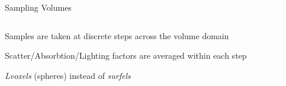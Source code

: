 \documentclass[10pt,compress,professionalfont]{beamer}
\begin{document}
\begin{frame}{Sampling Volumes}

    \begin{columns}
        \begin{column}{0.5\textwidth}

    Samples are taken at discrete steps across the volume domain\\
    \vspace{8mm}

    Scatter/Absorbtion/Lighting factors are averaged within each step\\
    \vspace{8mm}

    \textit{Lvoxels} (spheres) instead of \textit{surfels}

        \end{column}
        \begin{column}{0.5\textwidth}
            \includegraphics[width=\textwidth]{../img/diag/vol_step.pdf}\\
            \vspace{-4mm}
        \end{column}
    \end{columns}

\end{frame}
\end{document}

